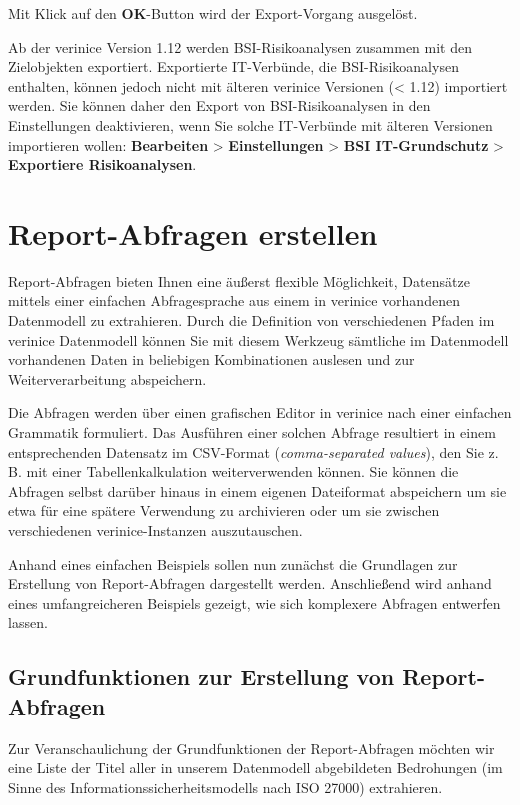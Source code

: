 \documentclass[a4paper,10pt]{book}
\newcommand{\zB}{\mbox{z.\,B.}\xspace}
\begin{document}
Mit Klick auf den \textbf{OK}-Button wird der Export-Vorgang ausgelöst.

Ab der verinice Version 1.12 werden BSI-Risikoanalysen zusammen mit den
Zielobjekten exportiert. Exportierte IT-Verbünde, die BSI-Risikoanalysen
enthalten, können jedoch nicht mit älteren verinice Versionen (< 1.12)
importiert werden. Sie können daher den Export von BSI-Risikoanalysen in den
Einstellungen deaktivieren, wenn Sie solche IT-Verbünde mit älteren Versionen
importieren wollen: \textbf{Bearbeiten} \textgreater \textbf{ Einstellungen}
\textgreater \textbf{ BSI IT-Grundschutz} \textgreater \textbf{ Exportiere
Risikoanalysen}.


\section{Report-Abfragen erstellen}\label{report-abfragen-erstellen}

Report-Abfragen bieten Ihnen eine äußerst flexible Möglichkeit, Datensätze
mittels einer einfachen Abfragesprache aus einem in verinice vorhandenen
Datenmodell zu extrahieren. Durch die Definition von verschiedenen Pfaden im
verinice Datenmodell können Sie mit diesem Werkzeug sämtliche im Datenmodell
vorhandenen Daten in beliebigen Kombinationen auslesen und zur
Weiterverarbeitung abspeichern.

Die Abfragen werden über einen grafischen Editor in verinice nach einer
einfachen Grammatik formuliert. Das Ausführen einer solchen Abfrage resultiert
in einem entsprechenden Datensatz im CSV-Format (\emph{comma-separated values}),
den Sie \zB mit einer Tabellenkalkulation weiterverwenden können. Sie können die
Abfragen selbst darüber hinaus in einem eigenen Dateiformat abspeichern um sie
etwa für eine spätere Verwendung zu archivieren oder um sie zwischen
verschiedenen verinice-Instanzen auszutauschen.

Anhand eines einfachen Beispiels sollen nun zunächst die Grundlagen zur
Erstellung von Report-Abfragen dargestellt werden. Anschließend wird anhand
eines umfangreicheren Beispiels gezeigt, wie sich komplexere Abfragen entwerfen
lassen.

\subsection{Grundfunktionen zur Erstellung von
Report-Abfragen}\label{grundfunktionen-zur-erstellung-von-report-abfragen}

Zur Veranschaulichung der Grundfunktionen der Report-Abfragen möchten wir eine
Liste der Titel aller in unserem Datenmodell abgebildeten Bedrohungen (im Sinne
des Informationssicherheitsmodells nach ISO 27000) extrahieren.
\end{document}
